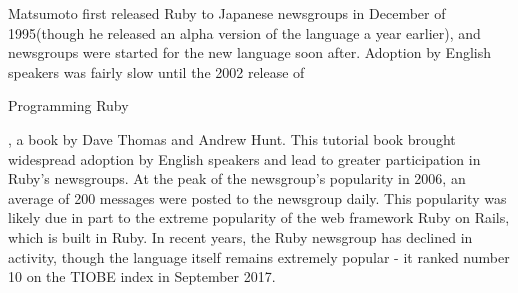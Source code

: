 \documentclass[12pt]{article}
\begin{document}
Matsumoto first released Ruby to Japanese newsgroups in December of 1995(though he released an alpha version of the language a year earlier), and newsgroups were started for the new language soon after\cite{earlyhistmatz}\cite{rubyinterview}. Adoption by English speakers was fairly slow until the 2002 release of \begin{it}Programming Ruby\end{it}, a book by Dave Thomas and Andrew Hunt. This tutorial book brought widespread adoption by English speakers and lead to greater participation in Ruby's newsgroups. At the peak of the newsgroup's popularity in 2006, an average of 200 messages were posted to the newsgroup daily\cite{generalRb}. This popularity was likely due in part to the extreme popularity of the web framework Ruby on Rails, which is built in Ruby. In recent years, the Ruby newsgroup has declined in activity, though the language itself remains extremely popular - it ranked number 10 on the TIOBE index in September 2017\cite{tiobe2017}.





\pagebreak

{}
\end{document}
